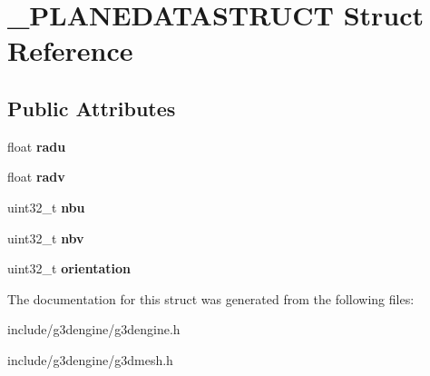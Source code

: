 \hypertarget{struct__PLANEDATASTRUCT}{}\section{\+\_\+\+P\+L\+A\+N\+E\+D\+A\+T\+A\+S\+T\+R\+U\+CT Struct Reference}
\label{struct__PLANEDATASTRUCT}
\subsection*{Public Attributes}
\begin{DoxyCompactItemize}
\item 
\mbox{\label{struct__PLANEDATASTRUCT_a9bdf348f3dc3d6f1d5b13f65c0fc7b0c}} 
float {\bfseries radu}
\item 
\mbox{\label{struct__PLANEDATASTRUCT_ab1ac31b390fde0e8ecd40a8815f4979e}} 
float {\bfseries radv}
\item 
\mbox{\label{struct__PLANEDATASTRUCT_ab87b9e86ef263b1a76697c243fe68b1d}} 
uint32\+\_\+t {\bfseries nbu}
\item 
\mbox{\label{struct__PLANEDATASTRUCT_ad5acfa52461249d42cdd86363afa7b7d}} 
uint32\+\_\+t {\bfseries nbv}
\item 
\mbox{\label{struct__PLANEDATASTRUCT_a502b5040855d196adf36e791ae049a65}} 
uint32\+\_\+t {\bfseries orientation}
\end{DoxyCompactItemize}


The documentation for this struct was generated from the following files\+:\begin{DoxyCompactItemize}
\item 
include/g3dengine/g3dengine.\+h\item 
include/g3dengine/g3dmesh.\+h\end{DoxyCompactItemize}
